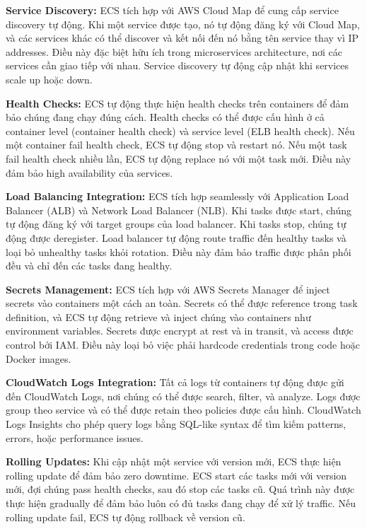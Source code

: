 \textbf{Service Discovery:} ECS tích hợp với AWS Cloud Map để cung cấp service discovery tự động. Khi một service được tạo, nó tự động đăng ký với Cloud Map, và các services khác có thể discover và kết nối đến nó bằng tên service thay vì IP addresses. Điều này đặc biệt hữu ích trong microservices architecture, nơi các services cần giao tiếp với nhau. Service discovery tự động cập nhật khi services scale up hoặc down.

\textbf{Health Checks:} ECS tự động thực hiện health checks trên containers để đảm bảo chúng đang chạy đúng cách. Health checks có thể được cấu hình ở cả container level (container health check) và service level (ELB health check). Nếu một container fail health check, ECS tự động stop và restart nó. Nếu một task fail health check nhiều lần, ECS tự động replace nó với một task mới. Điều này đảm bảo high availability của services.

\textbf{Load Balancing Integration:} ECS tích hợp seamlessly với Application Load Balancer (ALB) và Network Load Balancer (NLB). Khi tasks được start, chúng tự động đăng ký với target groups của load balancer. Khi tasks stop, chúng tự động được deregister. Load balancer tự động route traffic đến healthy tasks và loại bỏ unhealthy tasks khỏi rotation. Điều này đảm bảo traffic được phân phối đều và chỉ đến các tasks đang healthy.

\textbf{Secrets Management:} ECS tích hợp với AWS Secrets Manager để inject secrets vào containers một cách an toàn. Secrets có thể được reference trong task definition, và ECS tự động retrieve và inject chúng vào containers như environment variables. Secrets được encrypt at rest và in transit, và access được control bởi IAM. Điều này loại bỏ việc phải hardcode credentials trong code hoặc Docker images.

\textbf{CloudWatch Logs Integration:} Tất cả logs từ containers tự động được gửi đến CloudWatch Logs, nơi chúng có thể được search, filter, và analyze. Logs được group theo service và có thể được retain theo policies được cấu hình. CloudWatch Logs Insights cho phép query logs bằng SQL-like syntax để tìm kiếm patterns, errors, hoặc performance issues.

\textbf{Rolling Updates:} Khi cập nhật một service với version mới, ECS thực hiện rolling update để đảm bảo zero downtime. ECS start các tasks mới với version mới, đợi chúng pass health checks, sau đó stop các tasks cũ. Quá trình này được thực hiện gradually để đảm bảo luôn có đủ tasks đang chạy để xử lý traffic. Nếu rolling update fail, ECS tự động rollback về version cũ.

